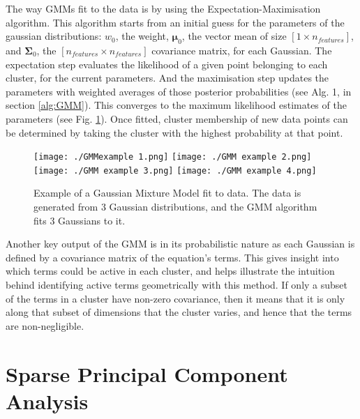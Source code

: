 \documentclass[12pt]{report} %
\begin{document}
\vspace{5mm}

The way GMMs fit to the data is by using the Expectation-Maximisation algorithm. This algorithm starts from an initial guess for the parameters of the gaussian distributions: $w_0$, the weight, $\mathbf{\mu}_{0}$, the vector mean of size $[1 \times n_{features}]$, and $\mathbf{\Sigma}_{0}$, the $[n_{features} \times n_{features}]$ covariance matrix, for each Gaussian. The expectation step evaluates the likelihood of a given point belonging to each cluster, for the current parameters. And the maximisation step updates the parameters with weighted averages of those posterior probabilities\cite{dempster1977maximum} (see Alg. 1, in section \ref{alg:GMM}). This converges to the maximum likelihood estimates of the parameters (see Fig. \ref{fig:GMM_example}). Once fitted, cluster membership of new data points can be determined by taking the cluster with the highest probability at that point.

\begin{figure}[htbp]
  \centering
  \texttt{[image: ./GMMexample 1.png]}
  \texttt{[image: ./GMM example 2.png]}
  \texttt{[image: ./GMM example 3.png]}
  \texttt{[image: ./GMM example 4.png]}
  \caption{Example of a Gaussian Mixture Model fit to data. The data is generated from 3 Gaussian distributions, and the GMM algorithm fits 3 Gaussians to it. \cite[1D Example Notebook]{gmm_towardsdatascience}}
  \label{fig:GMM_example}
\end{figure}

Another key output of the GMM is in its probabilistic nature as each Gaussian is defined by a covariance matrix of the equation's terms. This gives insight into which terms could be active in each cluster, and helps illustrate the intuition behind identifying active terms geometrically with this method. If only a subset of the terms in a cluster have non-zero covariance, then it means that it is only along that subset of dimensions that the cluster varies, and hence that the terms are non-negligible.

\section{Sparse Principal Component Analysis}
\end{document}
